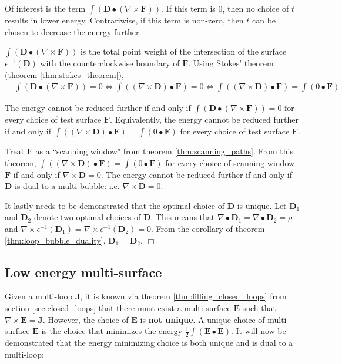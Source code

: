 Of interest is the term \(\int (\mathbf{D} \bullet (\nabla \times \mathbf{F}))\). If this term is \(0\), then no choice of \(t\) results in lower energy. Contrariwise, if this term is non-zero, then \(t\) can be chosen to decrease the energy further. 

\(\int (\mathbf{D} \bullet (\nabla \times \mathbf{F}))\) is the total point weight of the intersection of the surface \(\epsilon^{-1}(\mathbf{D})\) with the counterclockwise boundary of \(\mathbf{F}\). Using Stokes' theorem (theorem \ref{thm:stokes_theorem}), 
\begin{align*}
& \int (\mathbf{D} \bullet (\nabla \times \mathbf{F})) = 0
\iff \int ((\nabla \times \mathbf{D}) \bullet \mathbf{F}) = 0 
\iff \int ((\nabla \times \mathbf{D}) \bullet \mathbf{F}) = \int (0 \bullet \mathbf{F}) 
\end{align*}

The energy cannot be reduced further if and only if \(\int (\mathbf{D} \bullet (\nabla \times \mathbf{F})) = 0\) for every choice of test surface \(\mathbf{F}\). Equivalently, the energy cannot be reduced further if and only if \(\int ((\nabla \times \mathbf{D}) \bullet \mathbf{F}) = \int (0 \bullet \mathbf{F})\) for every choice of test surface \(\mathbf{F}\).

Treat \(\mathbf{F}\) as a ``scanning window" from theorem \ref{thm:scanning_paths}. From this theorem, \(\int ((\nabla \times \mathbf{D}) \bullet \mathbf{F}) = \int (0 \bullet \mathbf{F})\) for every choice of scanning window \(\mathbf{F}\) if and only if \(\nabla \times \mathbf{D} = 0\). The energy cannot be reduced further if and only if \(\mathbf{D}\) is dual to a multi-bubble: i.e. \(\nabla \times \mathbf{D} = 0\).

It lastly needs to be demonstrated that the optimal choice of \(\mathbf{D}\) is unique. Let \(\mathbf{D}_1\) and \(\mathbf{D}_2\) denote two optimal choices of \(\mathbf{D}\). This means that \(\nabla \bullet \mathbf{D}_1 = \nabla \bullet \mathbf{D}_2 = \rho\) and \(\nabla \times \epsilon^{-1}(\mathbf{D}_1) = \nabla \times \epsilon^{-1}(\mathbf{D}_2) = 0\). From the corollary of theorem \ref{thm:loop_bubble_duality}, \(\mathbf{D}_1 = \mathbf{D}_2\). \(\Box\) 



\subsection{Low energy multi-surface}

Given a multi-loop \(\mathbf{J}\), it is known via theorem \ref{thm:filling_closed_loops} from section \ref{sec:closed_loops} that there must exist a multi-surface \(\mathbf{E}\) such that \(\nabla \times \mathbf{E} = \mathbf{J}\). However, the choice of \(\mathbf{E}\) is {\bf not unique}. A unique choice of multi-surface \(\mathbf{E}\) is the choice that minimizes the energy \(\frac{1}{2}\int (\mathbf{E} \bullet \mathbf{E})\). It will now be demonstrated that the energy minimizing choice is both unique and is dual to a multi-loop:

